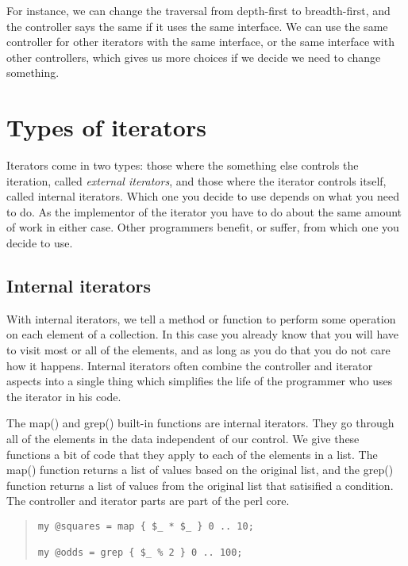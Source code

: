 For instance, we can change the traversal from depth-first to
breadth-first, and the controller says the same if it uses the same
interface.  We can use the same controller for other iterators with
the same interface, or the same interface with other controllers,
which gives us more choices if we decide we need to change something.

    \section{Types of iterators}
    
Iterators come in two types: those where the something else controls
the iteration, called {\it external iterators}, and those where
the iterator controls itself, called {internal iterators}.  Which one
you decide to use depends on what you need to do.  As the implementor
of the iterator you have to do about the same amount of work in either
case.  Other programmers benefit, or suffer, from which one you
decide to use.

    \subsection{Internal iterators}
    
With internal iterators, we tell a method or function to perform some
operation on each element of a collection.  In this case you already
know that you will have to visit most or all of the elements, and as
long as you do that you do not care how it happens.  Internal iterators
often combine the controller and iterator aspects into a single thing
which simplifies the life of the programmer who uses the iterator in his
code.

The map() and grep() built-in functions are internal iterators.  They
go through all of the elements in the data independent of our control.
We give these functions a bit of code that they apply to each of the
elements in a list.  The map() function returns a list of values based
on the original list, and the grep() function returns a list of values
from the original list that satisified a condition.  The controller
and iterator parts are part of the perl core.

\begin{quote}
\begin{verbatim}
my @squares = map { $_ * $_ } 0 .. 10;

my @odds = grep { $_ % 2 } 0 .. 100;
\end{verbatim}
\end{quote}

